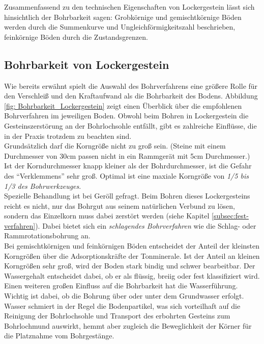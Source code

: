 \documentclass[12pt,a4paper,draft]{scrartcl} %
\begin{document}
Zusammenfassend zu den technischen Eigenschaften von Lockergestein lässt sich hinsichtlich der Bohrbarkeit sagen: Grobkörnige und gemischtkörnige Böden werden durch die Summenkurve und Ungleichförmigkeitszahl beschrieben, feinkörnige Böden durch die Zustandsgrenzen.

\subsection{Bohrbarkeit von Lockergestein}
\label{subsec:Bohrbarkeit_Lockergestein}
Wie bereits erwähnt spielt die Auswahl des Bohrverfahrens eine größere Rolle für den Verschleiß und den Kraftaufwand als die Bohrbarkeit des Bodens. Abbildung \ref{fig: Bohrbarkeit_Lockergestein} zeigt einen Überblick über die empfohlenen Bohrverfahren im jeweiligen Boden. Obwohl beim Bohren in Lockergestein die Gesteinszerstörung an der Bohrlochsohle entfällt, gibt es zahlreiche Einflüsse, die in der Praxis trotzdem zu beachten sind.\\

Grundsätzlich darf die Korngröße nicht zu groß sein. (Steine mit einem Durchmesser von 
30cm passen nicht in ein Rammgerät mit 5cm Durchmesser.) Ist der Korndurchmesser knapp 
kleiner als der Bohrdurchmesser, ist die Gefahr des "`Verklemmens"' sehr groß. Optimal ist eine maxiale Korngröße von \emph{1/5 bis 1/3 des Bohrwerkzeuges}.\\

Spezielle Behandlung ist bei Geröll gefragt. Beim Bohren dieses Lockergesteins reicht es nicht, nur das Bohrgut aus seinem natürlichen Verbund zu lösen, sondern das Einzelkorn muss dabei zerstört werden (siehe Kapitel \ref{subsec:fest-verfahren}). Dabei bietet sich ein \emph{schlagendes Bohrverfahren} wie die Schlag- oder Rammrotationsbohrung an.\\

Bei gemischtkörnigen und feinkörnigen Böden entscheidet der Anteil der kleinsten Korngrößen über die Adsorptionskräfte der Tonminerale. Ist der Anteil an kleinen Korngrößen sehr groß, wird der Boden stark bindig und schwer bearbeitbar. Der Wassergehalt entscheidet dabei, ob er als flüssig, breiig oder fest klassifiziert wird.\\

Einen weiteren großen Einfluss auf die Bohrbarkeit hat die Wasserführung. Wichtig ist dabei, ob die Bohrung über oder unter dem Grundwasser erfolgt. Wasser schmiert in der Regel die Bodenpartikel, was sich vorteilhaft auf die Reinigung der Bohrlochsohle und Transport des erbohrten Gesteins zum Bohrlochmund auswirkt, hemmt aber zugleich die Beweglichkeit der Körner für die Platznahme vom Bohrgestänge.\\
\end{document}
